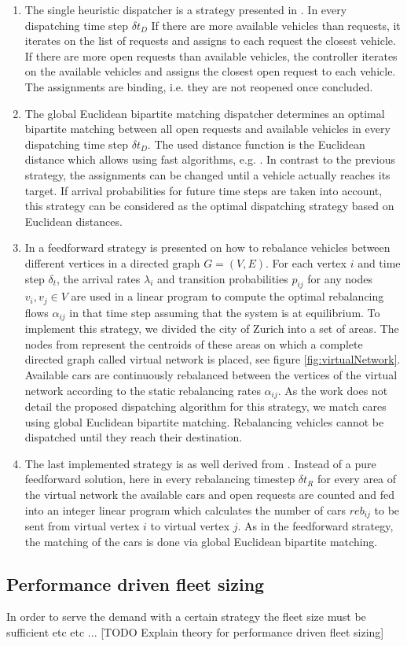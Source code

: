 \begin{enumerate}
\item The single heuristic dispatcher is a strategy presented in \cite{bischoff2016simulation}. In every dispatching time step $\delta t_D$ If there are more available vehicles than requests, it iterates on the list of requests and assigns to each request the closest vehicle. If there are more open requests than available vehicles, the controller iterates on the available vehicles and assigns the closest open request to each vehicle. The assignments are binding, i.e. they are not reopened once concluded.
\item The global Euclidean bipartite matching dispatcher determines an optimal bipartite matching between all open requests and available vehicles in every dispatching time step $\delta t_D$. The used distance function is the Euclidean distance which allows using fast algorithms, e.g. \cite{agarwal2004near}. In contrast to the previous strategy, the assignments can be changed until a vehicle actually reaches its target. If arrival probabilities for future time steps are taken into account, this strategy can be considered as the optimal dispatching strategy based on Euclidean distances.
\item In \cite{pavone2011load} a feedforward strategy is presented on how to rebalance vehicles between different vertices in a directed graph $G = (V,E)$. For each vertex $i$ and time step $\delta_t$, the arrival rates $\lambda_i$ and transition probabilities $p_{ij}$ for any nodes $v_i, v_j \in V$  are used in a linear program to compute the optimal rebalancing flows $\alpha _{ij}$ in that time step assuming that the system is at equilibrium. To implement this strategy, we divided the city of Zurich into a set of areas. The nodes from \cite{pavone2011load} represent the centroids of these areas on which a complete directed graph called virtual network is placed, see figure \ref{fig:virtualNetwork}. Available cars are continuously rebalanced between the vertices of the virtual network according to the static rebalancing rates $\alpha_{ij}$. As the work does not detail the proposed dispatching algorithm for this strategy, we match cares using global Euclidean bipartite matching. Rebalancing vehicles cannot be dispatched until they reach their destination.
\item The last implemented strategy is as well derived from \cite{pavone2011load}. Instead of a pure feedforward solution, here in every rebalancing timestep $\delta t_R$ for every area of the virtual network the available cars and open requests are counted and fed into an integer linear program which calculates the number of cars $reb _{ij}$ to be sent from virtual vertex $i$ to virtual vertex $j$. As in the feedforward strategy, the matching of the cars is done via global Euclidean bipartite matching.
\end{enumerate}

\subsection{Performance driven fleet sizing}

In order to serve the demand with a certain strategy the fleet size must be sufficient etc etc ... [TODO Explain theory for performance driven fleet sizing]
